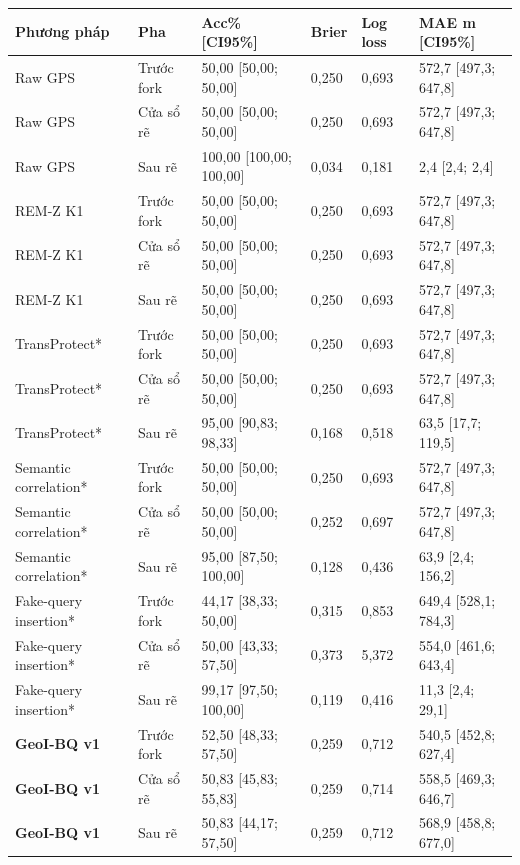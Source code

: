 \par\smallskip\noindent\begin{tabularx}{\linewidth}{@{}P{3cm}P{2.1cm}X P{1cm}P{1cm}X@{}}\toprule
\textbf{Phương pháp} & \textbf{Pha} & \textbf{Acc\% [CI95\%]} & \textbf{Brier} & \textbf{Log loss} & \textbf{MAE m [CI95\%]} \\
\midrule
Raw GPS & Trước fork & 50{,}00 [50{,}00; 50{,}00] & 0{,}250 & 0{,}693 & 572{,}7 [497{,}3; 647{,}8] \\
Raw GPS & Cửa sổ rẽ & 50{,}00 [50{,}00; 50{,}00] & 0{,}250 & 0{,}693 & 572{,}7 [497{,}3; 647{,}8] \\
Raw GPS & Sau rẽ & 100{,}00 [100{,}00; 100{,}00] & 0{,}034 & 0{,}181 & 2{,}4 [2{,}4; 2{,}4] \\
REM-Z K1 & Trước fork & 50{,}00 [50{,}00; 50{,}00] & 0{,}250 & 0{,}693 & 572{,}7 [497{,}3; 647{,}8] \\
REM-Z K1 & Cửa sổ rẽ & 50{,}00 [50{,}00; 50{,}00] & 0{,}250 & 0{,}693 & 572{,}7 [497{,}3; 647{,}8] \\
REM-Z K1 & Sau rẽ & 50{,}00 [50{,}00; 50{,}00] & 0{,}250 & 0{,}693 & 572{,}7 [497{,}3; 647{,}8] \\
TransProtect* & Trước fork & 50{,}00 [50{,}00; 50{,}00] & 0{,}250 & 0{,}693 & 572{,}7 [497{,}3; 647{,}8] \\
TransProtect* & Cửa sổ rẽ & 50{,}00 [50{,}00; 50{,}00] & 0{,}250 & 0{,}693 & 572{,}7 [497{,}3; 647{,}8] \\
TransProtect* & Sau rẽ & 95{,}00 [90{,}83; 98{,}33] & 0{,}168 & 0{,}518 & 63{,}5 [17{,}7; 119{,}5] \\
Semantic correlation* & Trước fork & 50{,}00 [50{,}00; 50{,}00] & 0{,}250 & 0{,}693 & 572{,}7 [497{,}3; 647{,}8] \\
Semantic correlation* & Cửa sổ rẽ & 50{,}00 [50{,}00; 50{,}00] & 0{,}252 & 0{,}697 & 572{,}7 [497{,}3; 647{,}8] \\
Semantic correlation* & Sau rẽ & 95{,}00 [87{,}50; 100{,}00] & 0{,}128 & 0{,}436 & 63{,}9 [2{,}4; 156{,}2] \\
Fake-query insertion* & Trước fork & 44{,}17 [38{,}33; 50{,}00] & 0{,}315 & 0{,}853 & 649{,}4 [528{,}1; 784{,}3] \\
Fake-query insertion* & Cửa sổ rẽ & 50{,}00 [43{,}33; 57{,}50] & 0{,}373 & 5{,}372 & 554{,}0 [461{,}6; 643{,}4] \\
Fake-query insertion* & Sau rẽ & 99{,}17 [97{,}50; 100{,}00] & 0{,}119 & 0{,}416 & 11{,}3 [2{,}4; 29{,}1] \\
\textbf{GeoI-BQ v1} & Trước fork & 52{,}50 [48{,}33; 57{,}50] & 0{,}259 & 0{,}712 & 540{,}5 [452{,}8; 627{,}4] \\
\textbf{GeoI-BQ v1} & Cửa sổ rẽ & 50{,}83 [45{,}83; 55{,}83] & 0{,}259 & 0{,}714 & 558{,}5 [469{,}3; 646{,}7] \\
\textbf{GeoI-BQ v1} & Sau rẽ & 50{,}83 [44{,}17; 57{,}50] & 0{,}259 & 0{,}712 & 568{,}9 [458{,}8; 677{,}0] \\
\bottomrule\end{tabularx}\par\smallskip
